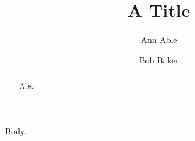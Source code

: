 \documentclass[sor,lengthcheck]{revtex4-2}
\begin{document}
\title{A Title}
\author{Ann Able}
\author{Bob Baker}
\begin{abstract}Abs.\end{abstract}
\maketitle
{}
Body.
\end{document}
